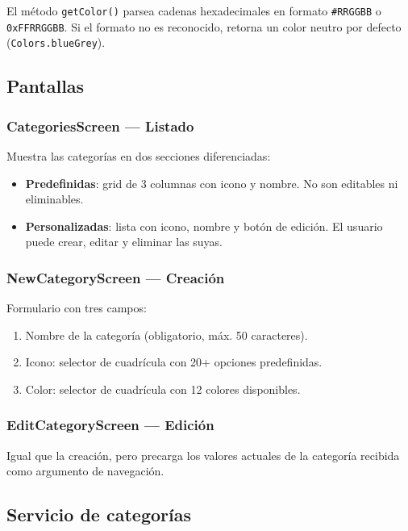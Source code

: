 \documentclass[12pt, letterpaper]{article}
\newcommand{\campo}[1]{\texttt{#1}}
\begin{document}
El método \campo{getColor()} parsea cadenas hexadecimales en formato
\campo{\#RRGGBB} o \campo{0xFFRRGGBB}. Si el formato no es reconocido,
retorna un color neutro por defecto (\campo{Colors.blueGrey}).

\subsection{Pantallas}

\subsubsection{CategoriesScreen — Listado}

Muestra las categorías en dos secciones diferenciadas:

\begin{itemize}
  \item \textbf{Predefinidas}: grid de 3 columnas con icono y nombre.
        No son editables ni eliminables.
  \item \textbf{Personalizadas}: lista con icono, nombre y botón de edición.
        El usuario puede crear, editar y eliminar las suyas.
\end{itemize}

\subsubsection{NewCategoryScreen — Creación}

Formulario con tres campos:

\begin{enumerate}
  \item Nombre de la categoría (obligatorio, máx. 50 caracteres).
  \item Icono: selector de cuadrícula con 20+ opciones predefinidas.
  \item Color: selector de cuadrícula con 12 colores disponibles.
\end{enumerate}

\subsubsection{EditCategoryScreen — Edición}

Igual que la creación, pero precarga los valores actuales de la categoría
recibida como argumento de navegación.

\subsection{Servicio de categorías}
\end{document}
